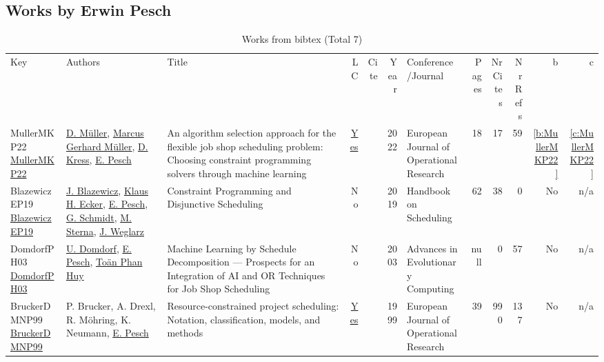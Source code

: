\subsection{Works by Erwin Pesch}
\label{sec:a445}
{\scriptsize
\begin{longtable}{>{\raggedright\arraybackslash}p{3cm}>{\raggedright\arraybackslash}p{6cm}>{\raggedright\arraybackslash}p{6.5cm}rrrp{2.5cm}rrrrr}
\rowcolor{white}\caption{Works from bibtex (Total 7)}\\ \toprule
\rowcolor{white}Key & Authors & Title & LC & Cite & Year & \shortstack{Conference\\/Journal} & Pages & \shortstack{Nr\\Cites} & \shortstack{Nr\\Refs} & b & c \\ \midrule\endhead
\bottomrule
\endfoot
MullerMKP22 \href{https://doi.org/10.1016/j.ejor.2022.01.034}{MullerMKP22} & \hyperref[auth:a442]{D. M{\"{u}}ller}, \hyperref[auth:a443]{Marcus Gerhard M{\"{u}}ller}, \hyperref[auth:a444]{D. Kress}, \hyperref[auth:a445]{E. Pesch} & An algorithm selection approach for the flexible job shop scheduling problem: Choosing constraint programming solvers through machine learning & \href{works/MullerMKP22.pdf}{Yes} & \cite{MullerMKP22} & 2022 & European Journal of Operational Research & 18 & 17 & 59 & \ref{b:MullerMKP22} & \ref{c:MullerMKP22}\\
BlazewiczEP19 \href{https://ideas.repec.org/h/spr/ihichp/978-3-319-99849-7_16.html}{BlazewiczEP19} & \hyperref[auth:a775]{J. Blazewicz}, \hyperref[auth:a776]{Klaus H. Ecker}, \hyperref[auth:a445]{E. Pesch}, \hyperref[auth:a777]{G. Schmidt}, \hyperref[auth:a778]{M. Sterna}, \hyperref[auth:a779]{J. Weglarz} & {Constraint Programming and Disjunctive Scheduling} & No & \cite{BlazewiczEP19} & 2019 & {Handbook on Scheduling} & 62 & 38 & 0 & No & n/a\\
DomdorfPH03 \href{http://dx.doi.org/10.1007/978-3-642-18965-4_31}{DomdorfPH03} & \hyperref[auth:a982]{U. Domdorf}, \hyperref[auth:a445]{E. Pesch}, \hyperref[auth:a983]{To\"{a}n Phan Huy} & Machine Learning by Schedule Decomposition — Prospects for an Integration of AI and OR Techniques for Job Shop Scheduling & No & \cite{DomdorfPH03} & 2003 & Advances in Evolutionary Computing & null & 0 & 57 & No & n/a\\
BruckerDMNP99 \href{http://dx.doi.org/10.1016/s0377-2217(98)00204-5}{BruckerDMNP99} & P. Brucker, A. Drexl, R. M\"{o}hring, K. Neumann, \hyperref[auth:a445]{E. Pesch} & Resource-constrained project scheduling: Notation,  classification,  models,  and methods & \href{works/BruckerDMNP99.pdf}{Yes} & \cite{BruckerDMNP99} & 1999 & European Journal of Operational Research & 39 & 990 & 137 & No & n/a\\

\end{longtable}}
